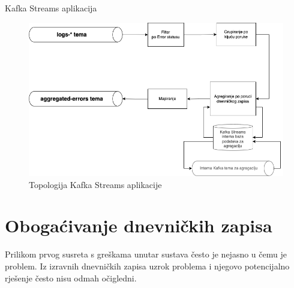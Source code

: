 \documentclass[times, utf8, diplomski]{fer}
\begin{document}
\begin{algorithm}
	\caption{Kafka Streams aplikacija}
	\label{algo:kstream}
	\begin{algorithmic}
		
		

		\ENDFOR
	\end{algorithmic}
\end{algorithm}

\begin{figure}[htb]
	\centering
	\includegraphics[width=15cm]{images/KStream.png}
	\caption[Topologija Kafka Streams aplikacije]{Topologija Kafka Streams aplikacije}
	\label{fig:kstream}
\end{figure}


\section{Obogaćivanje dnevničkih zapisa}
\label{sec:ai}

Prilikom prvog susreta s greškama unutar sustava često je nejasno u čemu je problem. Iz izravnih dnevničkih zapisa uzrok problema i njegovo potencijalno rješenje često nisu odmah očigledni.\\
\end{document}
